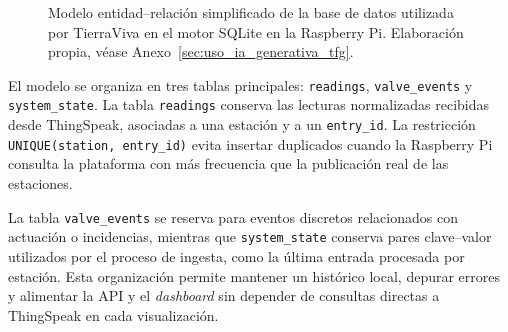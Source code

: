 \begin{figure}[H]
{%
}
\caption{Modelo entidad--relación simplificado de la base de datos utilizada por TierraViva en el motor SQLite en la Raspberry Pi. Elaboración propia, véase Anexo~\ref{sec:uso_ia_generativa_tfg}.}
\label{fig:er_tierraviva_sqlite}
\end{figure}

El modelo se organiza en tres tablas principales: \texttt{readings}, \texttt{valve\_events} y \texttt{system\_state}. La tabla \texttt{readings} conserva las lecturas normalizadas recibidas desde ThingSpeak, asociadas a una estación y a un \texttt{entry\_id}. La restricción \texttt{UNIQUE(station, entry\_id)} evita insertar duplicados cuando la Raspberry Pi consulta la plataforma con más frecuencia que la publicación real de las estaciones.

La tabla \texttt{valve\_events} se reserva para eventos discretos relacionados con actuación o incidencias, mientras que \texttt{system\_state} conserva pares clave--valor utilizados por el proceso de ingesta, como la última entrada procesada por estación. Esta organización permite mantener un histórico local, depurar errores y alimentar la API y el \textit{dashboard} sin depender de consultas directas a ThingSpeak en cada visualización.


